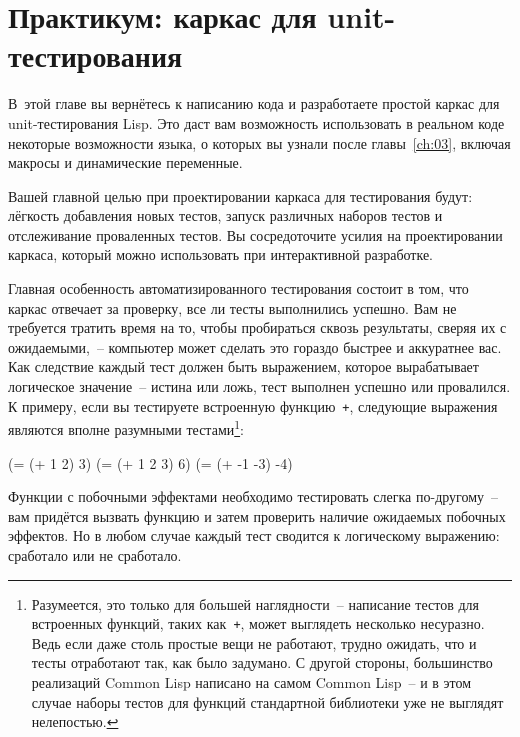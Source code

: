 \chapter{Практикум: каркас для unit-тестирования}
\label{ch:09}

\thispagestyle{empty}

В~этой главе вы вернётесь к написанию кода и разработаете простой каркас для
unit-тестирования Lisp. Это даст вам возможность использовать в реальном коде некоторые
возможности языка, о которых вы узнали после главы~\ref{ch:03}, включая макросы и динамические
переменные.

Вашей главной целью при проектировании каркаса для тестирования будут: лёгкость добавления
новых тестов, запуск различных наборов тестов и отслеживание проваленных тестов. Вы
сосредоточите усилия на проектировании каркаса, который можно использовать при
интерактивной разработке.

Главная особенность автоматизированного тестирования состоит в том, что каркас отвечает за
проверку, все ли тесты выполнились успешно. Вам не требуется тратить время на то, чтобы
пробираться сквозь результаты, сверяя их с ожидаемыми,~-- ком\-пью\-тер может сделать это
гораздо быстрее и аккуратнее вас. Как следствие каждый тест должен быть выражением,
которое вырабатывает логическое значение~-- истина или ложь, тест выполнен успешно или
провалился. К примеру, если вы тестируете встроенную функцию~\lstinline{+}, следующие
выражения являются вполне разумными тестами\footnote{Разумеется, это только для большей
  наглядности~-- написание тестов для встроенных функций, таких как~\lstinline{+}, может
  выглядеть несколько несуразно. Ведь если даже столь простые вещи не работают, трудно
  ожидать, что и тесты отработают так, как было задумано. С другой стороны, большинство
  реализаций Common Lisp написано на самом Common Lisp~-- и в этом случае наборы тестов
  для функций стандартной библиотеки уже не выглядят нелепостью.}\hspace{\footnotenegspace}:

\begin{myverb}
(= (+ 1 2) 3)
(= (+ 1 2 3) 6)
(= (+ -1 -3) -4)
\end{myverb}

Функции с побочными эффектами необходимо тестировать слегка по-другому~-- вам придётся
вызвать функцию и затем проверить наличие ожидаемых побочных эффектов. Но в любом случае каждый тест сводится
к логическому выражению: сработало или не сработало.


